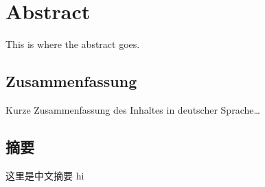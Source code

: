 \begingroup
\let\clearpage\relax
\let\cleardoublepage\relax
\let\cleardoublepage\relax

\chapter*{Abstract}
This is where the abstract goes. 

\vfill

\begin{otherlanguage}{ngerman}
\chapter*{Zusammenfassung}
Kurze Zusammenfassung des Inhaltes in deutscher Sprache\dots
\end{otherlanguage}

\vfill

\begin{otherlanguage}{ngerman}

\chapter*{摘要}
这里是中文摘要   hi

\end{otherlanguage}

\vfill

\endgroup